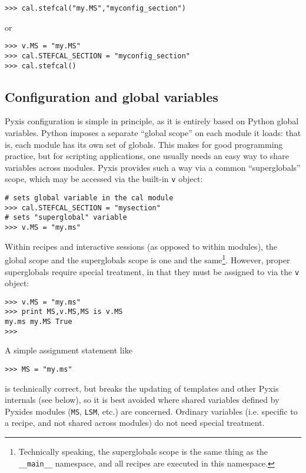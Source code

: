 \documentclass[a4paper,10pt]{article}
\begin{document}
\begin{verbatim}
>>> cal.stefcal("my.MS","myconfig_section") 
\end{verbatim}

or

\begin{verbatim}
>>> v.MS = "my.MS"
>>> cal.STEFCAL_SECTION = "myconfig_section"
>>> cal.stefcal() 
\end{verbatim}


\subsection{Configuration and global variables}
\label{sec:variables}

Pyxis configuration is simple in principle, as it is entirely based on Python global variables. Python imposes a separate
``global scope'' on each module it loads: that is, each module has its own set of globals. This makes for good programming practice, but for scripting applications, one usually needs an easy way to share variables across modules. Pyxis provides such a way via a
common ``superglobals'' scope, which may be accessed via the built-in {\tt v} object:

\begin{verbatim}
# sets global variable in the cal module
>>> cal.STEFCAL_SECTION = "mysection"   
# sets "superglobal" variable
>>> v.MS = "my.ms" 
\end{verbatim}

Within recipes and interactive sessions (as opposed to within modules), the global scope and the superglobals scope is one and the same\footnote{Technically speaking, the superglobals scope is the same thing as the {\tt \_\_main\_\_} namespace, and all recipes are
executed in this namespace.}. However, proper superglobals require special treatment, in that they must be assigned to via the {\tt v} object:

\begin{verbatim}
>>> v.MS = "my.ms" 
>>> print MS,v.MS,MS is v.MS   
my.ms my.MS True
>>>
\end{verbatim}

A simple assignment statement like

\begin{verbatim}
>>> MS = "my.ms" 
\end{verbatim}

is technically correct, but breaks the updating of templates and other Pyxis internals (see below), so it is best avoided where
shared variables defined by Pyxides modules ({\tt MS}, {\tt LSM}, etc.) are concerned. Ordinary variables (i.e. specific to a recipe, 
and not shared across modules) do not need special treatment.
\end{document}

